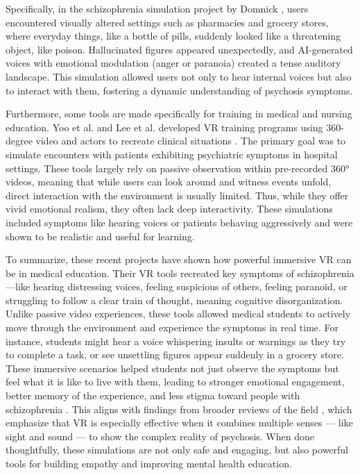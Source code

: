 Specifically, in the schizophrenia simulation project by Domnick \cite{Domnick2023}, users encountered visually altered settings such as pharmacies and grocery stores, where everyday things, like a bottle of pills, suddenly looked like a threatening object, like poison. Hallucinated figures appeared unexpectedly, and AI-generated voices with emotional modulation (anger or paranoia) created a tense auditory landscape. This simulation allowed users not only to hear internal voices but also to interact with them, fostering a dynamic understanding of psychosis symptoms.

\vspace{1em}

Furthermore, some tools are made specifically for training in medical and nursing education. Yoo et al. and Lee et al. developed VR training programs using 360-degree video and actors to recreate clinical situations \cite{Yoo2020, Lee2020}. The primary goal was to simulate encounters with patients exhibiting psychiatric symptoms in hospital settings. These tools largely rely on passive observation within pre-recorded 360° videos, meaning that while users can look around and witness events unfold, direct interaction with the environment is usually limited. Thus, while they offer vivid emotional realism, they often lack deep interactivity. These simulations included symptoms like hearing voices or patients behaving aggressively and were shown to be realistic and useful for learning.

\vspace{1em}

To summarize, these recent projects have shown how powerful immersive VR can be in medical education. Their VR tools recreated key symptoms of schizophrenia—like hearing distressing voices, feeling suspicious of others, feeling paranoid, or struggling to follow a clear train of thought, meaning cognitive disorganization. Unlike passive video experiences, these tools allowed medical students to actively move through the environment and experience the symptoms in real time. For instance, students might hear a voice whispering insults or warnings as they try to complete a task, or see unsettling figures appear suddenly in a grocery store. These immersive scenarios helped students not just observe the symptoms but feel what it is like to live with them, leading to stronger emotional engagement, better memory of the experience, and less stigma toward people with schizophrenia \cite{Kuhail2022,Domnick2023}. This aligns with findings from broader reviews of the field \cite{Lan2023,Bisso2020}, which emphasize that VR is especially effective when it combines multiple senses — like sight and sound — to show the complex reality of psychosis. When done thoughtfully, these simulations are not only safe and engaging, but also powerful tools for building empathy and improving mental health education.

